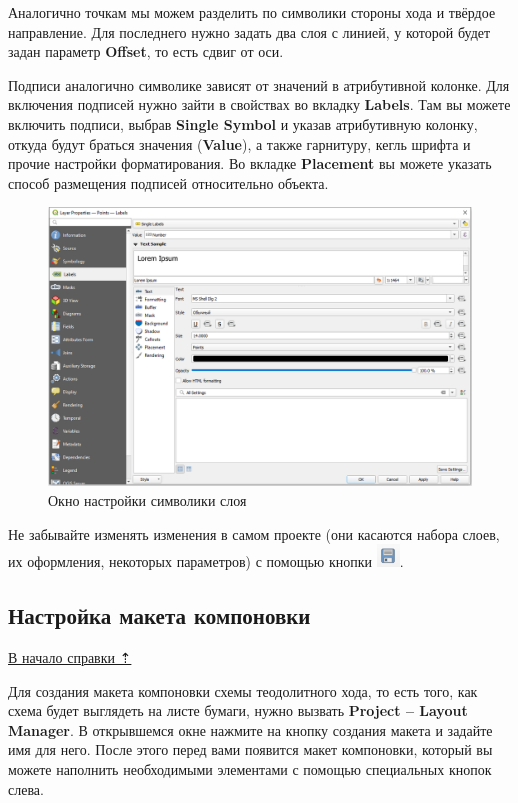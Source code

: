 \documentclass[
  12pt,
]{book}
\begin{document}
Аналогично точкам мы можем разделить по символики стороны хода и твёрдое направление. Для последнего нужно задать два слоя с линией, у которой будет задан параметр \textbf{Offset}, то есть сдвиг от оси.

Подписи аналогично символике зависят от значений в атрибутивной колонке. Для включения подписей нужно зайти в свойствах во вкладку \textbf{Labels}. Там вы можете включить подписи, выбрав \textbf{Single Symbol} и указав атрибутивную колонку, откуда будут браться значения (\textbf{Value}), а также гарнитуру, кегль шрифта и прочие настройки форматирования. Во вкладке \textbf{Placement} вы можете указать способ размещения подписей относительно объекта.

\begin{figure}
\centering
\includegraphics{images/Practice/Labels.png}
\caption{Окно настройки символики слоя}
\end{figure}

Не забывайте изменять изменения в самом проекте (они касаются набора слоев, их оформления, некоторых параметров) с помощью кнопки \includegraphics{images/Practice/Save_project.png}.

\subsection{Настройка макета компоновки}\label{practice-theod-layout}

\hyperref[practice-theod]{В начало справки ⇡}

Для создания макета компоновки схемы теодолитного хода, то есть того, как схема будет выглядеть на листе бумаги, нужно вызвать \textbf{Project -- Layout Manager}. В открывшемся окне нажмите на кнопку создания макета и задайте имя для него. После этого перед вами появится макет компоновки, который вы можете наполнить необходимыми элементами с помощью специальных кнопок слева.
\end{document}
